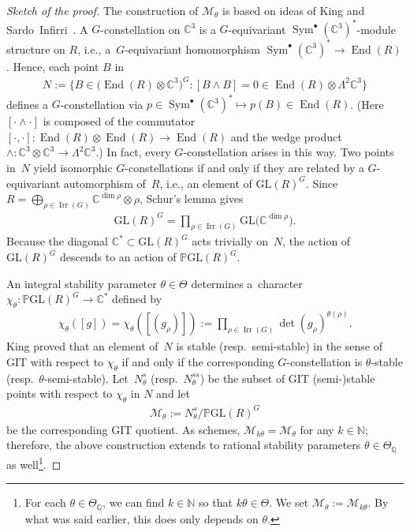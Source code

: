 \documentclass[pdftex]{sigma}
\numberwithin{equation}{section}
\newcommand{\sM}{\mathscr{M}}
\newcommand{\N}{{\mathbb N}}
\newcommand{\Q}{{\mathbb Q}}
\newcommand{\C}{{\mathbb C}}
\newcommand{\GL}{\mathrm{GL}}
\newcommand{\PGL}{{\mathbb P}\GL}
\newcommand{\Irr}{\operatorname{Irr}}
\newcommand{\End}{\operatorname{End}}
\newcommand{\Sym}{\operatorname{Sym}}
\begin{document}
\begin{proof}[Sketch of the proof]
  The construction of $\sM_\theta$ is based on ideas of King
  \cite{King1994} and Sardo~In\-f\/irri~\cite{SardoInfirri1996}.  A
  $G$-constellation on $\C^3$ is a $G$-equivariant
  $\Sym^\bullet(\C^3)^*$-module structure on $R$, i.e., a~$G$-equivariant homomorphism $\Sym^\bullet(\C^3)^* \to \End(R)$.
  Hence, each point $B$ in
  \begin{gather}
    \label{eq:N}
    N := \big\{ B\in\big(\End(R)\otimes \C^3\big)^G \colon [B\wedge B]=0\in\End(R)\otimes\Lambda^2\C^3 \big\}
  \end{gather}
  def\/ines a $G$-constellation via $p \in
  \Sym^\bullet(\C^3)^* \mapsto p(B) \in \End(R)$.
  (Here $[\cdot \wedge \cdot]$ is composed of the commutator $[\cdot, \cdot]\colon \End(R)\otimes\End(R) \to \End(R)$ and the wedge product $\wedge\colon \C^3\otimes \C^3 \to \Lambda^2 \C^3$.)
  In fact, every
  $G$-constellation arises in this way.  Two points in~$N$ yield
  isomorphic $G$-constellations if and only if they are related by a
  $G$-equivariant automorphism of~$R$, i.e., an element of
  $\GL(R)^G$.  Since $R=\bigoplus_{\rho \in \Irr(G)} \C^{\dim\rho}
  \otimes \rho$, Schur's lemma gives
  \begin{gather*}
    \GL(R)^G=\prod_{\rho\in \Irr(G)} \GL\big(\C^{\dim\rho}\big).
  \end{gather*}
  Because the diagonal $\C^*\subset \GL(R)^G$ acts trivially on~$N$, the
  action of $\GL(R)^G$ descends to an action of $\PGL(R)^G$.

  An integral stability parameter $\theta\in\Theta$ determines a~character $\chi_\theta\colon \PGL(R)^G\to\C^*$ def\/ined by
  \begin{gather}\label{eq:chitheta}
    \chi_\theta([g])
      = \chi_\theta([(g_\rho)])
     := \prod_{\rho\in \Irr(G)} \det(g_\rho)^{\theta(\rho)}.
  \end{gather}
  King \cite[Proposition~3.1]{King1994} proved that an element of~$N$
  is stable (resp.~semi-stable) in the sense of GIT with respect to
  $\chi_\theta$ if and only if the corresponding $G$-constellation is
  $\theta$-stable (resp.\ $\theta$-semi-stable).  Let~$N^s_\theta$
  (resp.~$N^{ss}_\theta$) be the subset of GIT (semi-)stable points with
  respect to $\chi_\theta$ in $N$ and let
  \begin{gather*}%
    \sM_\theta:=N^s_\theta/\PGL(R)^G
  \end{gather*}
  be the corresponding GIT quotient.  As schemes,
  $\sM_{k\theta}=\sM_{\theta}$ for any $k \in \N$; therefore, the
  above construction extends to rational stability parameters
  $\theta\in\Theta_\Q$ as well\footnote{For
    each $\theta\in\Theta_\Q$, we can f\/ind $k \in \N$ so that $k\theta \in \Theta$.
    We set $\sM_{\theta} := \sM_{k\theta}$.
    By what was said earlier, this does only depends on $\theta$.}.


\end{proof}
\end{document}
